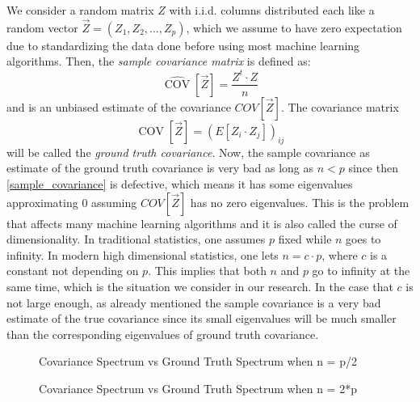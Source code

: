 \documentclass[12pt]{amsart}
\theoremstyle{definition}
\DeclareMathOperator{\Cov}{COV}
\numberwithin{equation}{section}
\numberwithin{equation}{section}
\theoremstyle{remark}
\numberwithin{equation}{section}
\begin{document}
We consider a random matrix $Z$ with i.i.d. columns distributed each like a random vector $\vec{Z}=(Z_1,Z_2,\ldots,Z_p)$, which we assume to have zero expectation due to standardizing the data  done before using most machine learning algorithms. Then, the {\it sample covariance matrix } is defined as:
\begin{equation}
\label{sample_covariance}
\hat{\Cov}[\vec{Z}]=\frac{Z^t \cdot Z}{n}
\end{equation}
and is an unbiased estimate of the covariance $COV[\vec{Z}]$. The covariance matrix
\begin{equation}
\label{covariance}
\Cov[\vec{Z}]=(E[Z_i\cdot Z_j])_{ij}
\end{equation}
will be  called the {\it ground truth covariance}.
Now, the sample covariance as estimate of the ground truth covariance is very bad as long as $n<p$ since then \ref{sample_covariance} is defective, which means it has some eigenvalues approximating $0$ assuming $COV[\vec{Z}]$ has no zero eigenvalues. This is the problem that affects many machine learning algorithms and it is also called the curse of dimensionality. In traditional statistics, one assumes $p$ fixed while $n$ goes to infinity. In modern high dimensional statistics, one lets $n=c\cdot p$, where $c$ is a constant not depending on $p$.
This implies that both $n$ and $p$ go to infinity at the same time, which is the situation we consider in our research. In the case that $c$ is not large enough, as already mentioned the sample covariance is a very bad estimate of the true covariance since its small eigenvalues will be much smaller than the corresponding eigenvalues of ground truth covariance.

\begin{figure} \centering
{}
  \caption{Covariance Spectrum vs Ground Truth Spectrum when n = p/2}
\end{figure}

\begin{figure} \centering
{}
  \caption{Covariance Spectrum vs Ground Truth Spectrum when n = 2*p}
\end{figure}
\end{document}
